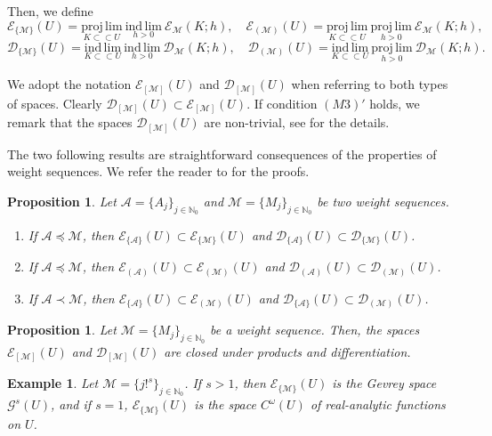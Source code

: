 \documentclass[11pt,reqno]{amsart}
\numberwithin{equation}{section}
\newtheorem{example}[theorem]{Example}
\newtheorem{proposition}[theorem]{Proposition}
\newcommand{\N}{{\mathbb{N}}} %
\newcommand{\E}{{\mathcal{E}}}
\newcommand{\D}{{\mathcal{D}}}
\newcommand{\Mj}{{\{M_j\}_{j\in\mathbb{N}_0}}} %
\newcommand{\Aj}{{\{A_j\}_{j\in\mathbb{N}_0}}} %
\newcommand{\M}{{\mathcal{M}}} %
\newcommand{\A}{{\mathcal{A}}} %
\begin{document}
Then, we define
%
\[\E_{\{\M\}}(U) = \underset{K\subset\subset U}{\mathrm{proj\,lim}}\ \underset{h>0}{\mathrm{ind\,lim}} \ \E_{\M}(K;h),
\quad
\mathcal{E}_{(\M)}(U) = \underset{K\subset\subset U}{\mathrm{proj\,lim}}\ \underset{h>0}{\mathrm{proj\,lim}} \ \E_{\M}(K;h),\]
%
\[\D_{\{\M\}}(U) = \underset{K\subset\subset U}{\mathrm{ind\,lim}}\ \underset{h>0}{\mathrm{ind\,lim}} \ \D_{\M}(K;h),
\quad
\D_{(\M)}(U) = \underset{K\subset\subset U}{\mathrm{ind\,lim}}\ \underset{h>0}{\mathrm{proj\,lim}} \ \D_{\M}(K;h).\]

We adopt the notation $\E_{[\M]}(U)$ and $\D_{[\M]}(U)$ when referring to both types of spaces. Clearly $\D_{[\M]}(U)\subset \E_{[\M]}(U)$. If condition $(M3)'$ holds, we remark that the spaces $\D_{[\M]}(U)$ are non-trivial, see \cite{BMT1990,BMM2007} for the details.

The two following results are straightforward consequences of the properties of weight sequences. We refer the reader to \cite{Komatsu_ultra_1} for the proofs.

\begin{proposition}\label{incl_E}
	Let $\A=\Aj$ and $\M=\Mj$ be two weight sequences.
	\begin{enumerate}
		\item[(a)] If $\A\preceq\M$, then $\mathcal{E}_{\{\A\}}(U) \subset \mathcal{E}_{\{\M\}}(U)$ and $\mathcal{D}_{\{\A\}}(U) \subset \mathcal{D}_{\{\M\}}(U)$.
		
		\item[(b)] If $\A\preceq\M$, then $\mathcal{E}_{(\A)}(U) \subset \mathcal{E}_{(\M)}(U)$ and $\mathcal{D}_{(\A)}(U) \subset \mathcal{D}_{(\M)}(U)$.
		
		\item[(c)] If $\A\prec\M$, then $\mathcal{E}_{\{\A\}}(U) \subset \mathcal{E}_{(\M)}(U)$ and $\mathcal{D}_{\{\A\}}(U) \subset \mathcal{D}_{(\M)}(U)$.
	\end{enumerate} 
\end{proposition}


\begin{proposition}\label{E_cl_prod_diff}
	Let $\M=\Mj$ be a weight sequence. Then, the spaces $\mathcal{E}_{[\M]}(U)$ and $\mathcal{D}_{[\M]}(U)$ are closed under products and differentiation.
\end{proposition}


\begin{example}
	Let $\M=\{j!^s\}_{j\in\N_0}$. If $s>1$, then $\mathcal{E}_{\{\M\}}(U)$ is the Gevrey space $\mathcal{G}^s(U)$, and if $s=1$, $\mathcal{E}_{\{\M\}}(U)$ is the space $C^\omega(U)$ of real-analytic functions on $U$.
\end{example}
\end{document}
